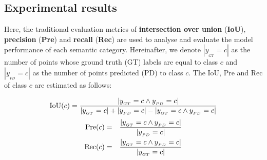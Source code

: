 \documentclass[journal]{IEEEtran}
\begin{document}


\subsection{Experimental results}


Here, the traditional evaluation metrics of \textbf{intersection over union} (\textbf{IoU}), \textbf{precision} (\textbf{Pre}) and \textbf{recall} (\textbf{Rec}) are used to analyse and evaluate the model performance of each semantic category.
Hereinafter, we denote $|y_{_{GT}}=c|$ as the number of points whose ground truth (GT) labels are equal to class $c$ and $|y_{_{PD}}=c|$ as the number of points predicted (PD) to class $c$.
The IoU, Pre and Rec of class $c$ are estimated as follows:

\vspace{-1mm}
\begin{equation}
{\rm IoU}(c) = \frac{|y_{_{GT}}=c \land y_{_{PD}}=c|}{|y_{_{GT}}=c|+|y_{_{PD}}=c|-|y_{_{GT}}=c \land y_{_{PD}}=c|}
\end{equation}
\vspace{-5mm}
\begin{eqnarray}
{\rm Pre}(c) &=& \frac{|y_{_{GT}}=c \land y_{_{PD}}=c|}{|y_{_{PD}}=c|}\\
{\rm Rec}(c) &=& \frac{|y_{_{GT}}=c \land y_{_{PD}}=c|}{|y_{_{GT}}=c|}
\end{eqnarray}
\end{document}
